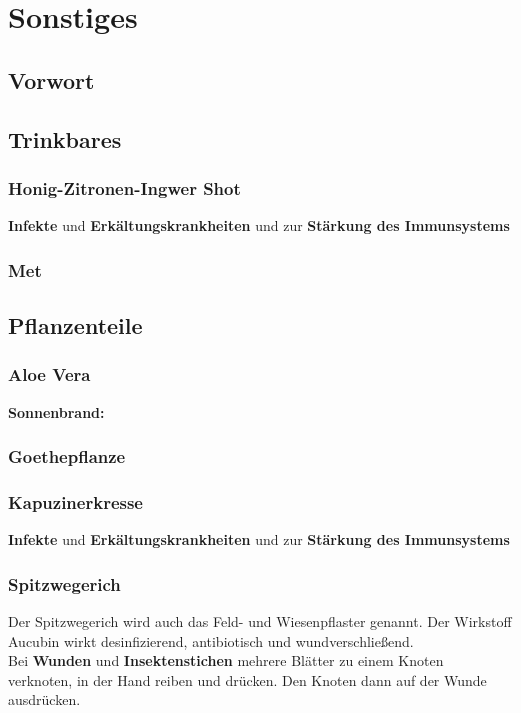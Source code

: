 \chapter{Sonstiges}

\section{Vorwort}

\lipsum[1-5]
\newpage





\section{Trinkbares}


\subsection{Honig-Zitronen-Ingwer Shot}

\textbf{Infekte} und \textbf{Erkältungskrankheiten} und zur \textbf{Stärkung des Immunsystems}


\subsection{Met}



\section{Pflanzenteile}


\subsection{Aloe Vera}

\textbf{Sonnenbrand:}


\subsection{Goethepflanze}


\subsection{Kapuzinerkresse}

\textbf{Infekte} und \textbf{Erkältungskrankheiten} und zur \textbf{Stärkung des Immunsystems}


\subsection{Spitzwegerich}

Der Spitzwegerich wird auch das Feld- und Wiesenpflaster genannt. Der Wirkstoff Aucubin wirkt desinfizierend, antibiotisch und wundverschließend.\\
Bei \textbf{Wunden} und \textbf{Insektenstichen} mehrere Blätter zu einem Knoten verknoten, in der Hand reiben und drücken. Den Knoten dann auf der Wunde ausdrücken. ~\cite{swrhandwerkskunst}

